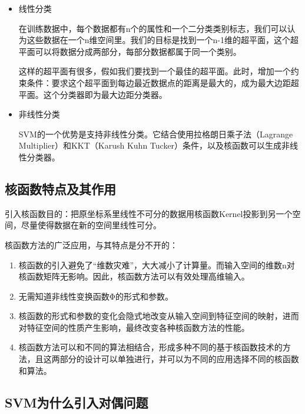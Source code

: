 \begin{itemize}\itemsep0em

	\item 线性分类

		在训练数据中，每个数据都有n个的属性和一个二分类类别标志，我们可以认为这些数据在一个n维空间里。我们的目标是找到一个n-1维的超平面，这个超平面可以将数据分成两部分，每部分数据都属于同一个类别。

		这样的超平面有很多，假如我们要找到一个最佳的超平面。此时，增加一个约束条件：要求这个超平面到每边最近数据点的距离是最大的，成为最大边距超平面。这个分类器即为最大边距分类器。

	\item 非线性分类

		SVM的一个优势是支持非线性分类。它结合使用拉格朗日乘子法（Lagrange Multiplier）和KKT（Karush Kuhn Tucker）条件，以及核函数可以生成非线性分类器。
\end{itemize}

\subsection{核函数特点及其作用}

引入核函数目的：把原坐标系里线性不可分的数据用核函数Kernel投影到另一个空间，尽量使得数据在新的空间里线性可分。

核函数方法的广泛应用，与其特点是分不开的：

\begin{enumerate}\itemsep0em
		\item 核函数的引入避免了``维数灾难''，大大减小了计算量。而输入空间的维数n对核函数矩阵无影响。因此，核函数方法可以有效处理高维输入。
		\item 无需知道非线性变换函数Φ的形式和参数。
		\item 核函数的形式和参数的变化会隐式地改变从输入空间到特征空间的映射，进而对特征空间的性质产生影响，最终改变各种核函数方法的性能。
		\item 核函数方法可以和不同的算法相结合，形成多种不同的基于核函数技术的方法，且这两部分的设计可以单独进行，并可以为不同的应用选择不同的核函数和算法。
\end{enumerate}

\subsection{SVM为什么引入对偶问题}

